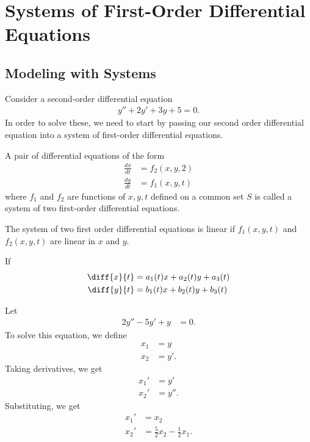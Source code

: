 \documentclass[10pt]{mypackage}
\begin{document}
\section{Systems of First-Order Differential Equations}%
\subsection{Modeling with Systems}%
Consider a second-order differential equation
\begin{align*}
  y'' + 2y' + 3y + 5 = 0.
\end{align*}
In order to solve these, we need to start by passing our second order differential equation into a system of first-order differential equations.
\begin{definition}
  A pair of differential equations of the form
  \begin{align*}
    \frac{dx}{dt} &= f_2\left(x,y,2\right)\\
    \frac{dy}{dt} &= f_1\left(x,y,t\right)
  \end{align*}
  where $f_1$ and $f_2$ are functions of $x,y,t$ defined on a common set $S$ is called a system of two first-order differential equations.
\end{definition}
\begin{definition}
  The system of two first order differential equations is linear if $f_1(x,y,t)$ and $f_2(x,y,t)$ are linear in $x$ and $y$.
\end{definition}
\begin{example}
  If
  \begin{align*}
    \diff{x}{t} &= a_1(t)x + a_2(t)y + a_3(t)\\
    \diff{y}{t} &= b_1(t)x + b_2(t)y + b_3(t)
  \end{align*}
\end{example}
\begin{example}
  Let
  \begin{align*}
    2y'' - 5y' + y &= 0.
  \end{align*}
  To solve this equation, we define
  \begin{align*}
    x_1 &= y\\
    x_2 &= y'.
  \end{align*}
  Taking derivatives, we get
  \begin{align*}
    x_1' &= y'\\
    x_2' &= y''.
  \end{align*}
  Substituting, we get
  \begin{align*}
    x_1' &= x_2\\
    x_2' &= \frac{5}{2}x_2 - \frac{1}{2}x_1.
  \end{align*}
\end{example}
\end{document}
